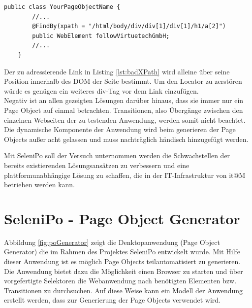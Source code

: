 \begin{lstlisting}[caption={Einfacher XPath-Locator des Projektes OHMAP},label={lst:badXPath}]
	public class YourPageObjectName {
		//...		
 		@FindBy(xpath = "/html/body/div/div[1]/div[1]/h1/a[2]")
		public WebElement followVirtuetechGmbH;	
		//...
	}
\end{lstlisting}

Der zu adressierende Link in Listing \ref{lst:badXPath} wird alleine über seine Position innerhalb des DOM der Seite bestimmt.
Um den Locator zu zerstören würde es genügen ein weiteres div-Tag vor dem Link einzufügen.
\\
Negativ ist an allen gezeigten Lösungen darüber hinaus, dass sie immer nur ein Page Object auf einmal betrachten. Transitionen, also Übergänge zwischen den einzelnen Webseiten der zu testenden Anwendung, werden somit nicht beachtet. Die dynamische Komponente der Anwendung wird beim generieren der Page Objects außer acht gelassen und muss nachträglich händisch hinzugefügt werden.

Mit SeleniPo soll der Versuch unternommen werden die Schwachstellen der bereits existierenden Lösungsansätzen zu verbessern und eine plattformunabhängige Lösung zu schaffen, die in der IT-Infrastruktur von it@M betrieben werden kann.

\newpage
\section{SeleniPo - Page Object Generator}
\label{sec:selenipo_pogenerator}

Abbildung \ref{fig:poGenerator} zeigt die Denktopanwendung (Page Object Generator) die im Rahmen des Projektes SeleniPo entwickelt wurde. Mit Hilfe dieser Anwendung ist es möglich Page Objects teilautomatisiert zu generieren. Die Anwendung bietet dazu die Möglichkeit einen Browser zu starten und über vorgefertigte Selektoren die Webanwendung nach benötigten Elementen bzw. Transitionen zu durchsuchen. Auf diese Weise kann ein Modell der Anwendung erstellt werden, dass zur Generierung der Page Objects verwendet wird.


